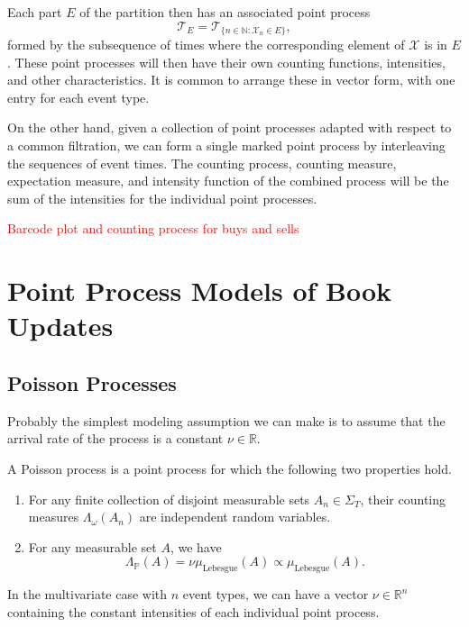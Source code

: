 \documentclass[honours,12pt]{unswthesis}
\numberwithin{equation}{section}
\begin{document}
Each part $E$ of the partition then has an associated point process $$\mathcal{T}_E = \mathcal{T}_{\{n\in\mathbb{N} : \mathcal{X}_n\in E\}},$$ formed by the subsequence of times where the corresponding element of $\mathcal{X}$ is in $E$. These point processes will then have their own counting functions, intensities, and other characteristics. It is common to arrange these in vector form, with one entry for each event type.

On the other hand, given a collection of point processes adapted with respect to a common filtration, we can form a single marked point process by interleaving the sequences of event times. The counting process, counting measure, expectation measure, and intensity function of the combined process will be the sum of the intensities for the individual point processes.

\textcolor{red}{Barcode plot and counting process for buys and sells}



\section{Point Process Models of Book Updates}

\subsection{Poisson Processes}
Probably the simplest modeling assumption we can make is to assume that the arrival rate of the process is a constant $\nu\in\mathbb{R}$.

A Poisson process is a point process for which the following two properties hold.
\begin{enumerate}
	\item For any finite collection of disjoint measurable sets $A_n\in\Sigma_T$, their counting measures $\Lambda_\omega(A_n)$ are independent random variables.
	\item For any measurable set $A$, we have $$\Lambda_{\mathbb P}(A) = \nu \mu_{\mathrm{Lebesgue}}(A)\propto\mu_{\mathrm{Lebesgue}}(A).$$
\end{enumerate}

In the multivariate case with $n$ event types, we can have a vector $\nu\in\mathbb{R}^n$ containing the constant intensities of each individual point process.
\end{document}
